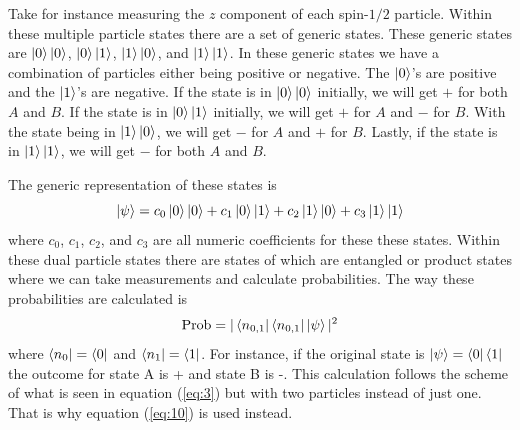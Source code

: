 \documentclass[twocolumn]{article}
\begin{document}
\newline
Take for instance measuring the $z$ component of each spin-$1/2$ particle. Within these multiple particle states there are a set of generic states. These generic states are $\ket{0}\ket{0}$, $\ket{0}\ket{1}$, $\ket{1}\ket{0}$, and $\ket{1}\ket{1}$. In these generic states we have a combination of particles either being positive or negative. The $\ket{0}$'s are positive and the $\ket{1}$'s are negative. If the state is in $\ket{0}\ket{0}$ initially, we will get $+$ for both $A$ and $B$. If the state is in $\ket{0}\ket{1}$ initially, we will get $+$ for $A$ and $-$ for $B$. With the state being in $\ket{1}\ket{0}$, we will get $-$ for $A$ and $+$ for $B$. Lastly, if the state is in $\ket{1}\ket{1}$, we will get $-$ for both $A$ and $B$.

The generic representation of these states is
\begin{equation}\label{eq:9}
\ket{\psi}=c_0\ket{0}\ket{0}+c_1\ket{0}\ket{1}+c_2\ket{1}\ket{0}+c_3\ket{1}\ket{1}
\end{equation}
where $c_0$, $c_1$, $c_2$, and $c_3$ are all numeric coefficients for these these states. Within these dual particle states there are states of which are entangled or product states where we can take measurements and calculate probabilities. The way these probabilities are calculated is
\begin{equation}\label{eq:10}
\text{Prob}=|\bra{n_{0,1}}\bra{n_{0,1}}\ket{\psi}|^2
\end{equation}
where $\bra{n_0}=\bra{0}$ and $\bra{n_1}=\bra{1}$. For instance, if the original state is $\ket{\psi}=\bra{0}\bra{1}$ the outcome for state A is + and state B is -. This calculation follows the scheme of what is seen in equation (\ref{eq:3}) but with two particles instead of just one. That is why equation (\ref{eq:10}) is used instead.
\end{document}
